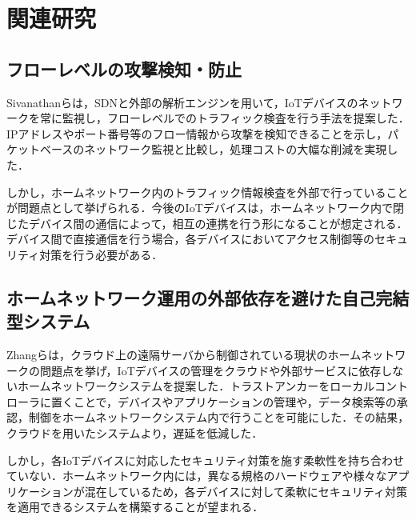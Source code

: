 \documentclass[a4paper,10pt,twocolumn,uplatex]{jsarticle}
\begin{document}
\section{関連研究}
\subsection{フローレベルの攻撃検知・防止}
Sivanathanらは，SDNと外部の解析エンジンを用いて，IoTデバイスのネットワークを常に監視し，フローレベルでのトラフィック検査を行う手法を提案した\cite{lowcost}．IPアドレスやポート番号等のフロー情報から攻撃を検知できることを示し，パケットベースのネットワーク監視と比較し，処理コストの大幅な削減を実現した．\par
しかし，ホームネットワーク内のトラフィック情報検査を外部で行っていることが問題点として挙げられる．今後のIoTデバイスは，ホームネットワーク内で閉じたデバイス間の通信によって，相互の連携を行う形になることが想定される\cite{d2d}．デバイス間で直接通信を行う場合，各デバイスにおいてアクセス制御等のセキュリティ対策を行う必要がある．

\subsection{ホームネットワーク運用の外部依存を避けた自己完結型システム}
Zhangらは，クラウド上の遠隔サーバから制御されている現状のホームネットワークの問題点を挙げ，IoTデバイスの管理をクラウドや外部サービスに依存しないホームネットワークシステムを提案した\cite{sover}．トラストアンカーをローカルコントローラに置くことで，デバイスやアプリケーションの管理や，データ検索等の承認，制御をホームネットワークシステム内で行うことを可能にした．その結果，クラウドを用いたシステムより，遅延を低減した．\par
しかし，各IoTデバイスに対応したセキュリティ対策を施す柔軟性を持ち合わせていない．ホームネットワーク内には，異なる規格のハードウェアや様々なアプリケーションが混在しているため，各デバイスに対して柔軟にセキュリティ対策を適用できるシステムを構築することが望まれる．
\end{document}
